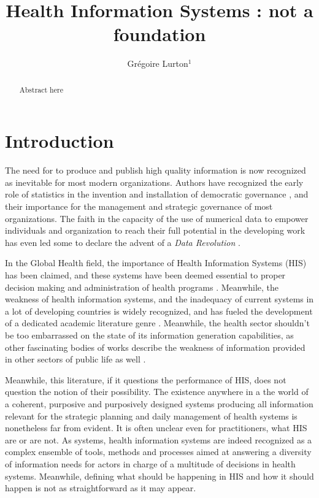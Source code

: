 \documentclass[letterpaper, 10 pt, conference]{ieeeconf}  %
\title{\LARGE \bf
Health Information Systems : not a foundation
}
\author{Grégoire Lurton$^{1}$ %
}
\begin{document}
\maketitle
\thispagestyle{empty}
\pagestyle{empty}


\begin{abstract}

Abstract here

\end{abstract}


\section{Introduction}

The need for to produce and publish high quality information is now recognized as inevitable for most modern organizations. Authors have recognized the early role of statistics in the invention and installation of democratic governance \cite{porter_trust_1996}, and their importance for the management and strategic governance of most organizations. The faith in the capacity of the use of numerical data to empower individuals and organization to reach their full potential in the developing work has even led some to declare the advent of a \textit{Data Revolution}\cite{independent_expert_group_on_a_data_revolution_for_sustainable_development_world_2014} \cite{center_for_global_development_delivering_2014}.

In the Global Health field, the importance of Health Information Systems (HIS) has been claimed, and these systems have been deemed essential to proper decision making and administration of health programs \cite{abou-zahr_health_2005}. Meanwhile, the weakness of health information systems, and the inadequacy of current systems in a lot of  developing countries is widely recognized, and has fueled the development of a dedicated academic literature genre \cite{abou-zahr_better_2010} \cite{kiberu_strengthening_2014}. Meanwhile, the health sector shouldn't be too embarrassed on the state of its information generation capabilities, as other fascinating bodies of works describe the weakness of information provided in other sectors of public life as well \cite{jerven_poor_2013}.

Meanwhile, this literature, if it questions the performance of HIS, does not question the notion of their possibility. The existence anywhere in a the world of a coherent, purposive and purposively designed systems producing all information relevant for the strategic planning and daily management of health systems is nonetheless far from evident. It is often unclear even for practitioners, what HIS are or are not. As systems, health information systems are indeed recognized as a complex ensemble of tools, methods and processes aimed at answering a diversity of information needs for actors in charge of a multitude of decisions in health systems. Meanwhile, defining what should be happening in HIS and how it should happen is not as straightforward as it may appear.
\end{document}
